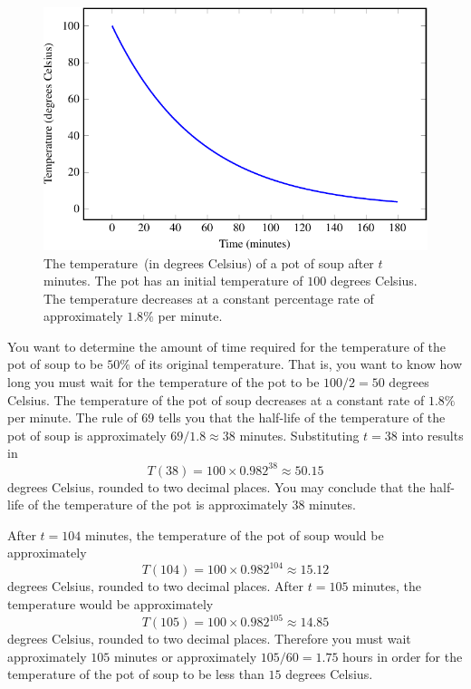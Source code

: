 \documentclass[a4paper,oneside,12pt]{article}
\begin{document}
{\begin{solution}
\begin{figure}[!htbp]
\centering
\includegraphics[scale=1.1]{image/11/soup.pdf}
\caption{%
  The temperature~(in degrees Celsius) of a pot of soup after $t$
  minutes.  The pot has an initial temperature of $100$ degrees
  Celsius.  The temperature decreases at a constant percentage rate of
  approximately $1.8\%$ per minute.
}
\label{fig:exponential:soup_temperature}
\end{figure}

You want to determine the amount of time required for the temperature
of the pot of soup to be $50\%$ of its original temperature.  That is,
you want to know how long you must wait for the temperature of the pot
to be $100 / 2 = 50$ degrees Celsius.  The temperature of the pot of
soup decreases at a constant rate of $1.8\%$ per minute.  The rule of
$69$ tells you that the half-life of the temperature of the pot of
soup is approximately $69 / 1.8 \approx 38$ minutes.  Substituting
$t = 38$ into  results in
\[
T(38)
=
100 \times 0.982^{38}
\approx
50.15
\]
degrees Celsius, rounded to two decimal places.  You may conclude
that the half-life of the temperature of the pot is approximately $38$
minutes.

After $t = 104$ minutes, the temperature of the pot of soup would be
approximately
\[
T(104)
=
100 \times 0.982^{104}
\approx
15.12
\]
degrees Celsius, rounded to two decimal places.  After $t = 105$
minutes, the temperature would be approximately
\[
T(105)
=
100 \times 0.982^{105}
\approx
14.85
\]
degrees Celsius, rounded to two decimal places.  Therefore you must
wait approximately $105$ minutes or approximately
$105 / 60 = 1.75$ hours in order for the temperature of the pot of
soup to be less than $15$ degrees Celsius.
\end{solution}
}{}
\end{document}
